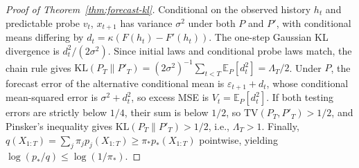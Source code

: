 \documentclass[11pt,letterpaper]{article}
\theoremstyle{definition}
\newcommand{\E}{\mathbb{E}}
\newcommand{\KL}{\mathrm{KL}}
\newcommand{\TV}{\mathrm{TV}}
\begin{document}
\begin{proof}[Proof of Theorem~\ref{thm:forecast-kl}]
Conditional on the observed history $h_t$ and predictable probe $v_t$, $x_{t+1}$ has variance $\sigma^2$ under both $P$ and $P'$, with conditional means differing by $d_t = \kappa(F(h_t) - F'(h_t))$. The one-step Gaussian KL divergence is $d_t^2 / (2\sigma^2)$. Since initial laws and conditional probe laws match, the chain rule gives $\KL(P_T \| P'_T) = (2\sigma^2)^{-1} \sum_{t < T} \E_P[d_t^2] = \Lambda_T / 2$. Under $P$, the forecast error of the alternative conditional mean is $\varepsilon_{t+1} + d_t$, whose conditional mean-squared error is $\sigma^2 + d_t^2$, so excess MSE is $V_t = \E_P[d_t^2]$. If both testing errors are strictly below $1/4$, their sum is below $1/2$, so $\TV(P_T, P'_T) > 1/2$, and Pinsker's inequality gives $\KL(P_T \| P'_T) > 1/2$, i.e., $\Lambda_T > 1$. Finally, $q(X_{1:T}) = \sum_j \pi_j p_j(X_{1:T}) \ge \pi_* p_*(X_{1:T})$ pointwise, yielding $\log(p_*/q) \le \log(1/\pi_*)$.
\end{proof}
\end{document}

